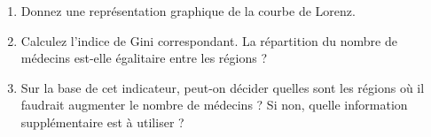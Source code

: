 \documentclass[a4paper,11pt]{article}
\begin{document}
\bigskip
\begin{enumerate}
\item Donnez une représentation graphique de la courbe de Lorenz.





\item Calculez l'indice de Gini correspondant. La répartition du nombre de médecins est-elle égalitaire entre les régions ?


\item Sur la base de cet indicateur, peut-on décider quelles sont les régions où il faudrait augmenter le nombre de médecins ? Si non, quelle information supplémentaire est à utiliser ?



\end{enumerate}
\end{document}
